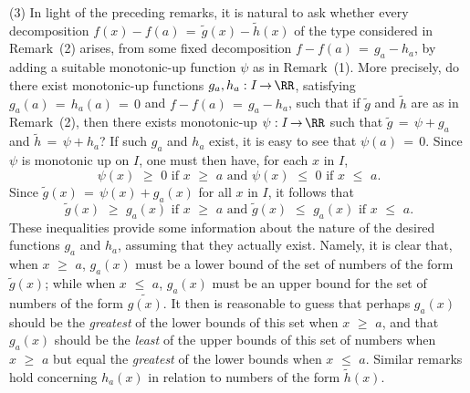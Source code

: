         (3) In light of the preceding remarks, it is natural to ask whether every decomposition $f(x)-f(a) \,=\, \tilde{g}(x) - \tilde{h}(x)$ of the type considered in Remark~(2) arises, from some fixed decomposition $f - f(a) \,=\, g_{a}-h_{a}$, by adding a suitable monotonic-up function ${\psi}$ as in Remark~(1).
    More precisely, do there exist monotonic-up functions $g_{a},h_{a}:I \,{\rightarrow}\, {\RR}$, satisfying $g_{a}(a) \,=\, h_{a}(a) \,=\, 0$
    and $f-f(a) \,=\, g_{a}-h_{a}$,
    such that if $\tilde{g}$ and $\tilde{h}$ are as in Remark~(2), then there exists monotonic-up ${\psi}:I \,{\rightarrow}\, {\RR}$ such that $\tilde{g} \,=\, {\psi}+g_{a}$ and $\tilde{h} \,=\, {\psi}+h_{a}$?
    If such $g_{a}$ and $h_{a}$ exist, it is easy to see that ${\psi}(a) \,=\, 0$. Since ${\psi}$ is monotonic up on $I$, one must then have, for each $x$ in $I$,
        \begin{displaymath}
        {\psi}(x)\,\,{\geq}\,\,0 \mbox{ if $x\,\,{\geq}\,\,a$} \mbox{ and }
        {\psi}(x)\,\,{\leq}\,\,0 \mbox{ if $x\,\,{\leq}\,\,a$}.
        \end{displaymath}
    Since $\tilde{g}(x) \,=\, {\psi}(x)+g_{a}(x)$ for all $x$ in $I$, it follows that
        \begin{displaymath}
        \tilde{g}(x)\,\,{\geq}\,\,g_{a}(x) \mbox{ if $x\,\,{\geq}\,\,a$} \mbox{ and }
        \tilde{g}(x)\,\,{\leq}\,\,g_{a}(x) \mbox{ if $x\,\,{\leq}\,\,a$}.
        \end{displaymath}
    These inequalities provide some information about the nature of the desired functions $g_{a}$ and $h_{a}$, assuming that they actually exist.
    Namely, it is clear that, when $x\,\,{\geq}\,\,a$, $g_{a}(x)$ must be a lower bound of the set of numbers of the form $\tilde{g}(x)$;
    while when $x\,\,{\leq}\,\,a$, $g_{a}(x)$ must be an upper bound for the set of numbers of the form $\tilde{g(x)}$.
    It then is reasonable to guess that perhaps $g_{a}(x)$ should be the {\em greatest} of the lower bounds of this set when $x\,\,{\geq}\,\,a$,
    and that $g_{a}(x)$ should be the {\em least} of the upper bounds of this set of numbers when $x\,\,{\geq}\,\,a$ but equal the {\em greatest} of the lower bounds when $x\,\,{\leq}\,\,a$.
    Similar remarks hold concerning $h_{a}(x)$ in relation to numbers of the form $\tilde{h}(x)$.

\V

